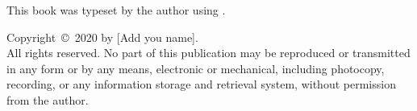 
\noindent
This book was typeset by the author using \LaTeXe.


\vfill


\noindent
Copyright~\copyright~2020 by [Add you name].
\\
All rights reserved. No part of this publication may be reproduced or
transmitted in any form or by any means, electronic or mechanical, including
photocopy, recording, or any information storage and retrieval system, without
permission from the author.

\bigskip
\noindent
{}